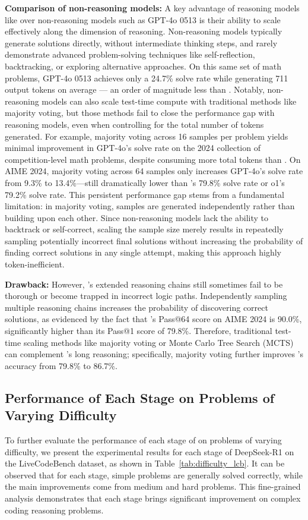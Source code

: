 \textbf{Comparison of non-reasoning models:} A key advantage of reasoning models like \dsri{} over non-reasoning models such as GPT-4o 0513 is their ability to scale effectively along the dimension of reasoning.
Non-reasoning models typically generate solutions directly, without intermediate thinking steps, and rarely demonstrate advanced problem-solving techniques like self-reflection, backtracking, or exploring alternative approaches.
On this same set of math problems, GPT-4o 0513 achieves only a 24.7\% solve rate while generating 711 output tokens on average — an order of magnitude less than \dsri{}.
Notably, non-reasoning models can also scale test-time compute with traditional methods like majority voting, but those methods fail to close the performance gap with reasoning models, even when controlling for the total number of tokens generated. For example, majority voting across 16 samples per problem yields minimal improvement in GPT-4o's solve rate on the 2024 collection of competition-level math problems, despite consuming more total tokens than \dsri{}. On AIME 2024, majority voting across 64 samples only increases GPT-4o's solve rate from 9.3\% to 13.4\%—still dramatically lower than \dsri{}'s 79.8\% solve rate or o1's 79.2\% solve rate. This persistent performance gap stems from a fundamental limitation: in majority voting, samples are generated independently rather than building upon each other. Since non-reasoning models lack the ability to backtrack or self-correct, scaling the sample size merely results in repeatedly sampling potentially incorrect final solutions without increasing the probability of finding correct solutions in any single attempt, making this approach highly token-inefficient.



\textbf{Drawback:} However, \dsri{}'s extended reasoning chains still sometimes fail to be thorough or become trapped in incorrect logic paths.
Independently sampling multiple reasoning chains increases the probability of discovering correct solutions, as evidenced by the fact that \dsri{}'s Pass@64 score on AIME 2024 is 90.0\%, significantly higher than its Pass@1 score of 79.8\%.
Therefore, traditional test-time scaling methods like majority voting or Monte Carlo Tree Search (MCTS) can complement \dsri{}'s long reasoning; specifically, majority voting further improves \dsri{}'s accuracy from 79.8\% to 86.7\%.

\subsection{ Performance of Each Stage on Problems of Varying Difficulty}

To further evaluate the performance of each stage of \dsri{} on problems of varying difficulty, we present the experimental results for each stage of DeepSeek-R1 on the LiveCodeBench dataset, as shown in Table~\ref{tab:difficulty_lcb}. It can be observed that for each stage, simple problems are generally solved correctly, while the main improvements come from medium and hard problems. This fine-grained analysis demonstrates that each stage brings significant improvement on complex coding reasoning problems.

